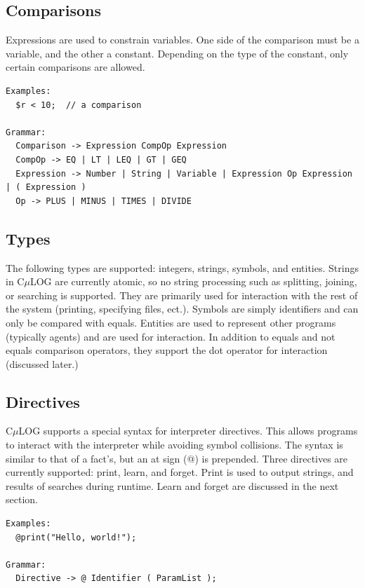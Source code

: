 \documentclass[onecolumn,titlepage]{article}
\begin{document}
\subsection{Comparisons}
Expressions are used to constrain variables.  One side of the
comparison must be a variable, and the other a constant.  Depending on
the type of the constant, only certain comparisons are allowed.

\begin{verbatim}
Examples:
  $r < 10;  // a comparison

Grammar:
  Comparison -> Expression CompOp Expression
  CompOp -> EQ | LT | LEQ | GT | GEQ
  Expression -> Number | String | Variable | Expression Op Expression | ( Expression )
  Op -> PLUS | MINUS | TIMES | DIVIDE
\end{verbatim}

\subsection{Types}
The following types are supported: integers, strings, symbols, and
entities.  Strings in C$\mu$LOG are currently atomic, so no string
processing such as splitting, joining, or searching is supported.
They are primarily used for interaction with the rest of the system
(printing, specifying files, ect.).  Symbols are simply identifiers
and can only be compared with equals.  Entities are used to represent
other programs (typically agents) and are used for interaction.  In
addition to equals and not equals comparison operators, they support
the dot operator for interaction (discussed later.)

\subsection{Directives}
C$\mu$LOG supports a special syntax for interpreter directives.  This
allows programs to interact with the interpreter while avoiding symbol
collisions. The syntax is similar to that of a fact's, but an at sign
(@) is prepended. Three directives are currently supported:
print, learn, and forget. Print is used to output strings, and results of
searches during runtime.  Learn and forget are discussed in the next
section.
\begin{verbatim}
Examples:
  @print("Hello, world!");

Grammar:
  Directive -> @ Identifier ( ParamList ); 
\end{verbatim}
\end{document}
